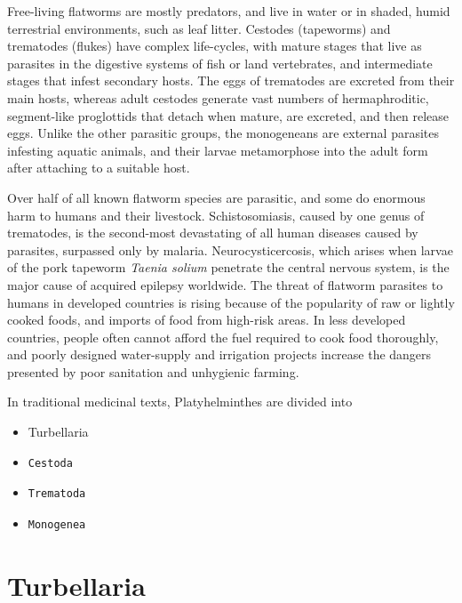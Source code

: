 \documentclass[]{book}
\begin{document}
Free-living flatworms are mostly predators, and live in water or in shaded, humid terrestrial environments, such as leaf litter. Cestodes (tapeworms) and trematodes (flukes) have complex life-cycles, with mature stages that live as parasites in the digestive systems of fish or land vertebrates, and intermediate stages that infest secondary hosts. The eggs of trematodes are excreted from their main hosts, whereas adult cestodes generate vast numbers of hermaphroditic, segment-like proglottids that detach when mature, are excreted, and then release eggs. Unlike the other parasitic groups, the monogeneans are external parasites infesting aquatic animals, and their larvae metamorphose into the adult form after attaching to a suitable host.

Over half of all known flatworm species are parasitic, and some do enormous harm to humans and their livestock. Schistosomiasis, caused by one genus of trematodes, is the second-most devastating of all human diseases caused by parasites, surpassed only by malaria. Neurocysticercosis, which arises when larvae of the pork tapeworm \emph{Taenia solium} penetrate the central nervous system, is the major cause of acquired epilepsy worldwide. The threat of flatworm parasites to humans in developed countries is rising because of the popularity of raw or lightly cooked foods, and imports of food from high-risk areas. In less developed countries, people often cannot afford the fuel required to cook food thoroughly, and poorly designed water-supply and irrigation projects increase the dangers presented by poor sanitation and unhygienic farming.

In traditional medicinal texts, Platyhelminthes are divided into

\begin{itemize}
\item
  Turbellaria
\item
\begin{verbatim}
Cestoda
\end{verbatim}
\item
\begin{verbatim}
Trematoda
\end{verbatim}
\item
\begin{verbatim}
Monogenea
\end{verbatim}
\end{itemize}

\hypertarget{turbellaria}{%
\section{Turbellaria}\label{turbellaria}}
\end{document}
